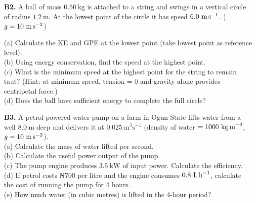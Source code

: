 \begin{exercisebox}[5]
\vspace{0.4cm}

\textbf{B2.} A ball of mass $0.50\ \text{kg}$ is
attached to a string and swings in a vertical circle
of radius $1.2\ \text{m}$. At the lowest point of
the circle it has speed $6.0\ \text{m\,s}^{-1}$.
($g = 10\ \text{m\,s}^{-2}$)\\[4pt]
\begin{center}
\end{center}
(a) Calculate the KE and GPE at the lowest point
(take lowest point as reference level).\\
(b) Using energy conservation, find the speed at
the highest point.\\
(c) What is the minimum speed at the highest point
for the string to remain taut? (Hint: at minimum
speed, tension = 0 and gravity alone provides
centripetal force.)\\
(d) Does the ball have sufficient energy to complete
the full circle?
\hfill{}

\vspace{0.4cm}

\textbf{B3.} A petrol-powered water pump on a farm
in Ogun State lifts water from a well $8.0\ \text{m}$
deep and delivers it at $0.025\ \text{m}^3\text{s}^{-1}$
(density of water $= 1000\ \text{kg\,m}^{-3}$,
$g = 10\ \text{m\,s}^{-2}$).\\[4pt]
(a) Calculate the mass of water lifted per second.\\
(b) Calculate the useful power output of the pump.\\
(c) The pump engine produces $3.5\ \text{kW}$ of
input power. Calculate the efficiency.\\
(d) If petrol costs ₦700 per litre and the engine
consumes $0.8\ \text{L\,h}^{-1}$, calculate the
cost of running the pump for 4 hours.\\
(e) How much water (in cubic metres) is lifted in
the 4-hour period?
\hfill{}

\vspace{0.4cm}


\end{exercisebox}
